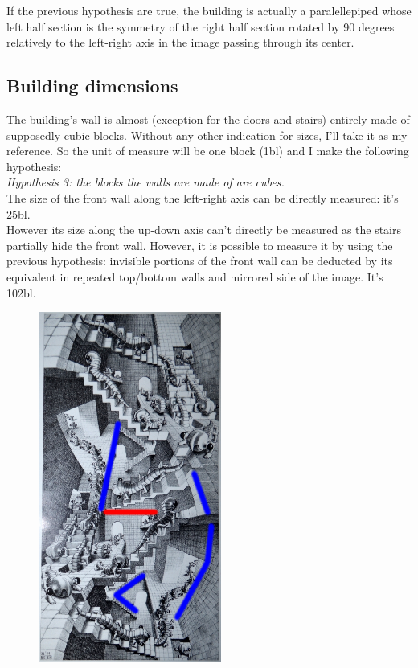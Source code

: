 \documentclass[12pt, a4paper]{article}
\begin{document}
If the previous hypothesis are true, the building is actually a paralellepiped whose left half section is the symmetry of the right half section rotated by 90 degrees relatively to the left-right axis in the image passing through its center.\\

\subsection{Building dimensions}

The building's wall is almost (exception for the doors and stairs) entirely made of supposedly cubic blocks. Without any other indication for sizes, I'll take it as my reference. So the unit of measure will be one block (1bl) and I make the following hypothesis:\\

\emph{Hypothesis 3: the blocks the walls are made of are cubes.}\\

The size of the front wall along the left-right axis can be directly measured: it's 25bl.\\

However its size along the up-down axis can't directly be measured as the stairs partially hide the front wall. However, it is possible to measure it by using the previous hypothesis: invisible portions of the front wall can be deducted by its equivalent in repeated top/bottom walls and mirrored side of the image. It's 102bl.\\

\begin{center}
\begin{figure}[H]
\centering\includegraphics[width=6cm]{./dimension.png}\\
\end{figure}
\end{center}
\end{document}

